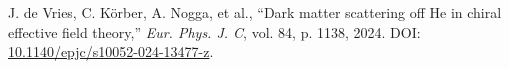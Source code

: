 \documentclass[a4paper,11pt]{article}
\begin{document}
\begin{thebibliography}{99}
  J. de Vries, C. Körber, A. Nogga, et al., ``Dark matter scattering
  off He in chiral effective field theory,'' \textit{Eur. Phys. J.
  C}, vol. 84, p. 1138, 2024. DOI:
  \href{https://doi.org/10.1140/epjc/s10052-024-13477-z}{10.1140/epjc/s10052-024-13477-z}.
\end{thebibliography}
\end{document}
